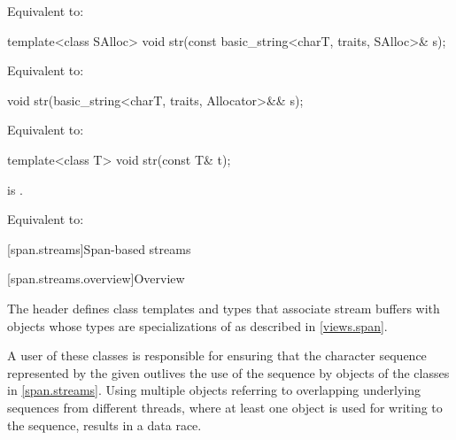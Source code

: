 \begin{itemdescr}
\pnum
\effects
Equivalent to: 
\end{itemdescr}

%
\begin{itemdecl}
template<class SAlloc>
  void str(const basic_string<charT, traits, SAlloc>& s);
\end{itemdecl}

\begin{itemdescr}
\pnum
\effects
Equivalent to: 
\end{itemdescr}

%
\begin{itemdecl}
void str(basic_string<charT, traits, Allocator>&& s);
\end{itemdecl}

\begin{itemdescr}
\pnum
\effects
Equivalent to: 
\end{itemdescr}

%
\begin{itemdecl}
template<class T>
  void str(const T& t);
\end{itemdecl}

\begin{itemdescr}
\pnum
\constraints
{}
is .

\pnum
\effects
Equivalent to: 
\end{itemdescr}

[span.streams]{Span-based streams}

[span.streams.overview]{Overview}

\pnum
The header  defines class templates and types
that associate stream buffers with objects whose types are
specializations of  as described in \ref{views.span}.
\begin{note}
A user of these classes is responsible for ensuring
that the character sequence represented by the given 
outlives the use of the sequence by objects of the classes in \ref{span.streams}.
Using multiple  objects
referring to overlapping underlying sequences from different threads,
where at least one  object is used
for writing to the sequence,
results in a data race.
\end{note}

